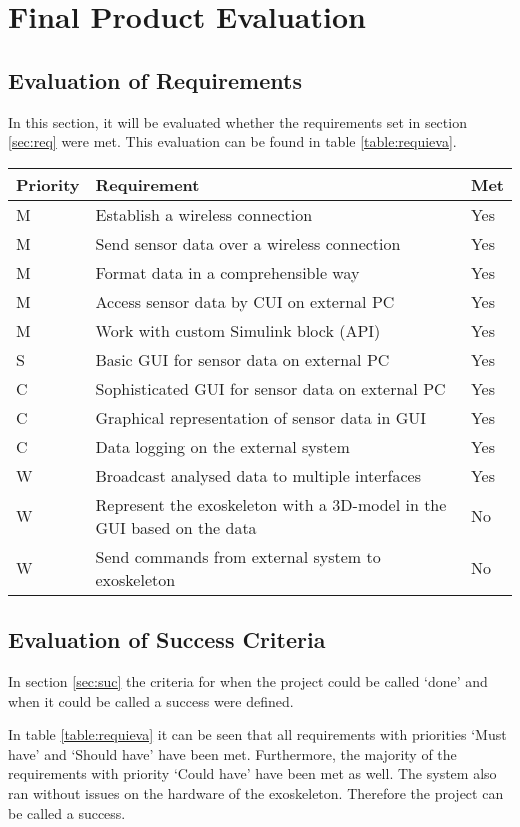 \chapter{Final Product Evaluation}
\section{Evaluation of Requirements}
In this section, it will be evaluated whether the requirements set in section \ref{sec:req} were met. This evaluation can be found in table \ref{table:requieva}.\\

{\renewcommand{\arraystretch}{1.5}
	\centering
	\begin{tabular}{ | l | l || l || }
		\hline
		\bfseries{Priority} & \bfseries{Requirement} & \bfseries{Met} \\ \hline
		M & Establish a wireless connection & Yes \\ \hline
		M & Send sensor data over a wireless connection & Yes \\ \hline
		M & Format data in a comprehensible way & Yes \\ \hline
		M & Access sensor data by CUI on external PC & Yes \\ \hline
		M & Work with custom Simulink block (API) & Yes \\ \hline
		S & Basic GUI for sensor data on external PC & Yes \\ \hline
		C & Sophisticated GUI for sensor data on external PC & Yes \\ \hline
		C & Graphical representation of sensor data in GUI & Yes \\ \hline
		C & Data logging on the external system & Yes \\ \hline
		W & Broadcast analysed data to multiple interfaces & Yes \\ \hline
		W & Represent the exoskeleton with a 3D-model in the GUI based on the data & No \\ \hline
		W & Send commands from external system to exoskeleton & No \\ \hline 
	\end{tabular}
	\label{table:requieva}
}

\section{Evaluation of Success Criteria} \label{sec:evasuc}
In section \ref{sec:suc} the criteria for when the project could be called `done' and when it could be called a success were defined.

In table \ref{table:requieva} it can be seen that all requirements with priorities `Must have' and `Should have' have been met. Furthermore, the majority of the requirements with priority `Could have' have been met as well. The system also ran without issues on the hardware of the exoskeleton. Therefore the project can be called a success.